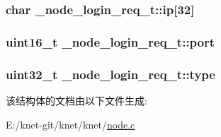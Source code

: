 \subsubsection[{ip}]{\setlength{\rightskip}{0pt plus 5cm}char \+\_\+node\+\_\+login\+\_\+req\+\_\+t\+::ip\mbox{[}32\mbox{]}}\label{a00038_ae712d0a161373e04dc6fdb44e215a6f3_ae712d0a161373e04dc6fdb44e215a6f3}
\hypertarget{a00038_a69d85f411c1b30cfb5cf3656ba479098_a69d85f411c1b30cfb5cf3656ba479098}{}
\subsubsection[{port}]{\setlength{\rightskip}{0pt plus 5cm}uint16\+\_\+t \+\_\+node\+\_\+login\+\_\+req\+\_\+t\+::port}\label{a00038_a69d85f411c1b30cfb5cf3656ba479098_a69d85f411c1b30cfb5cf3656ba479098}
\hypertarget{a00038_a9e4bf1dd6adaa732cefb24a4d45e3b39_a9e4bf1dd6adaa732cefb24a4d45e3b39}{}
\subsubsection[{type}]{\setlength{\rightskip}{0pt plus 5cm}uint32\+\_\+t \+\_\+node\+\_\+login\+\_\+req\+\_\+t\+::type}\label{a00038_a9e4bf1dd6adaa732cefb24a4d45e3b39_a9e4bf1dd6adaa732cefb24a4d45e3b39}


该结构体的文档由以下文件生成\+:\begin{DoxyCompactItemize}
\item 
E\+:/knet-\/git/knet/knet/\hyperlink{a00101}{node.\+c}\end{DoxyCompactItemize}
